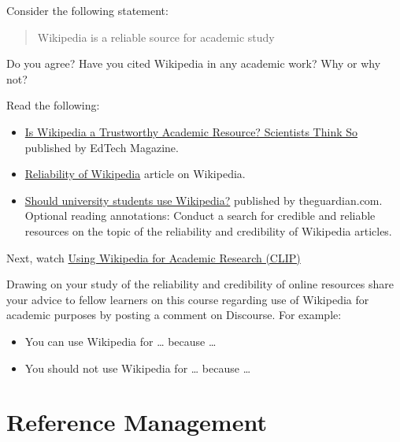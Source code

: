 \documentclass[
]{book}
\providecommand{\tightlist}{%
  \setlength{\itemsep}{0pt}\setlength{\parskip}{0pt}}
\theoremstyle{definition}
\theoremstyle{definition}
\theoremstyle{definition}
\theoremstyle{definition}
\theoremstyle{remark}
\begin{document}
\begin{reflect}
Consider the following statement:

\begin{quote}
Wikipedia is a reliable source for academic study
\end{quote}

Do you agree? Have you cited Wikipedia in any academic work? Why or why not?

Read the following:

\begin{itemize}
\tightlist
\item
  \href{https://edtechmagazine.com/higher/article/2017/12/wikipedia-trustworthy-academic-resource-scientists-think-so}{Is Wikipedia a Trustworthy Academic Resource? Scientists Think So} published by EdTech Magazine.
\item
  \href{https://en.wikipedia.org/wiki/Reliability_of_Wikipedia}{Reliability of Wikipedia} article on Wikipedia.\\
\item
  \href{https://www.theguardian.com/education/2013/may/13/should-university-students-use-wikipedia}{Should university students use Wikipedia?} published by theguardian.com.
  Optional reading annotations: Conduct a search for credible and reliable resources on the topic of the reliability and credibility of Wikipedia articles.
\end{itemize}

Next, watch \href{https://www.youtube.com/watch?v=Cql_yVUYj6A}{Using Wikipedia for Academic Research (CLIP)}

Drawing on your study of the reliability and credibility of online resources share your advice to fellow learners on this course regarding use of Wikipedia for academic purposes by posting a comment on Discourse. For example:

\begin{itemize}
\tightlist
\item
  You can use Wikipedia for \ldots{} because \ldots{}
\item
  You should not use Wikipedia for \ldots{} because \ldots{}
\end{itemize}
\end{reflect}

\hypertarget{reference-management}{%
\section{Reference Management}\label{reference-management}}
\end{document}
